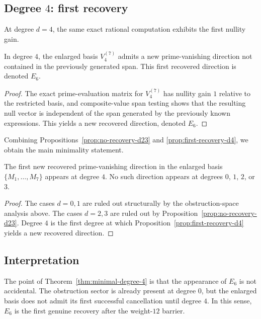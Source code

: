 \subsection{Degree $4$: first recovery}

At degree $d=4$, the same exact rational computation exhibits the first nullity gain.

\begin{proposition}\label{prop:first-recovery-d4}
In degree $4$, the enlarged basis $V_4^{(7)}$ admits a new prime-vanishing direction not contained in the previously generated span. This first recovered direction is denoted $E_6$.
\end{proposition}

\begin{proof}
The exact prime-evaluation matrix for $V_4^{(7)}$ has nullity gain $1$ relative to the restricted basis, and composite-value span testing shows that the resulting null vector is independent of the span generated by the previously known expressions. This yields a new recovered direction, denoted $E_6$.
\end{proof}

Combining Propositions~\ref{prop:no-recovery-d23} and \ref{prop:first-recovery-d4}, we obtain the main minimality statement.

\begin{theorem}\label{thm:minimal-degree-4}
The first new recovered prime-vanishing direction in the enlarged basis $\{M_1,\dots,M_7\}$ appears at degree $4$. No such direction appears at degrees $0$, $1$, $2$, or $3$.
\end{theorem}

\begin{proof}
The cases $d=0,1$ are ruled out structurally by the obstruction-space analysis above. The cases $d=2,3$ are ruled out by Proposition~\ref{prop:no-recovery-d23}. Degree $4$ is the first degree at which Proposition~\ref{prop:first-recovery-d4} yields a new recovered direction.
\end{proof}

\subsection{Interpretation}

The point of Theorem~\ref{thm:minimal-degree-4} is that the appearance of $E_6$ is not accidental. The obstruction sector is already present at degree $0$, but the enlarged basis does not admit its first successful cancellation until degree $4$. In this sense, $E_6$ is the first genuine recovery after the weight-$12$ barrier.
